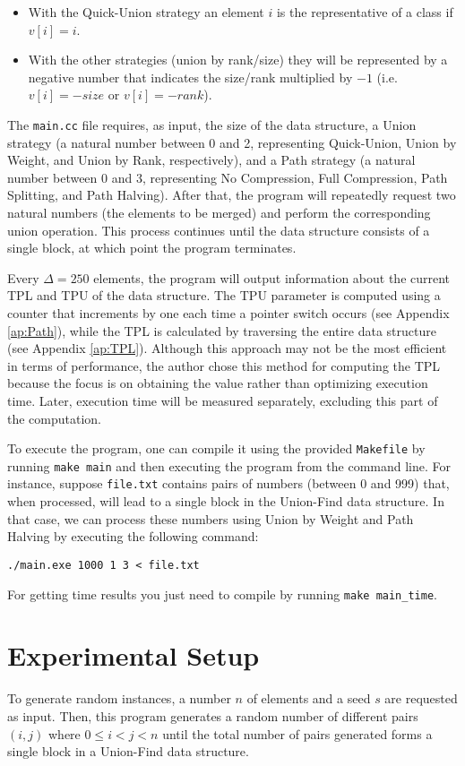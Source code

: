 \begin{itemize}
    \item With the Quick-Union strategy an element $i$ is the representative of a class if $v[i] = i$.
    \item With the other strategies (union by rank/size) they will be represented by a negative number that indicates the size/rank multiplied by $-1$ (i.e. $v[i] = -size$ or $v[i] = -rank$).
\end{itemize}

The \texttt{main.cc} file requires, as input, the size of the data structure, a Union strategy (a natural number between 0 and 2, representing Quick-Union, Union by Weight, and Union by Rank, respectively), and a Path strategy (a natural number between 0 and 3, representing No Compression, Full Compression, Path Splitting, and Path Halving). After that, the program will repeatedly request two natural numbers (the elements to be merged) and perform the corresponding union operation. This process continues until the data structure consists of a single block, at which point the program terminates.

Every $\Delta = 250$ elements, the program will output information about the current TPL and TPU of the data structure. The TPU parameter is computed using a counter that increments by one each time a pointer switch occurs (see Appendix \ref{ap:Path}), while the TPL is calculated by traversing the entire data structure (see Appendix \ref{ap:TPL}). Although this approach may not be the most efficient in terms of performance, the author chose this method for computing the TPL because the focus is on obtaining the value rather than optimizing execution time. Later, execution time will be measured separately, excluding this part of the computation.

To execute the program, one can compile it using the provided \texttt{Makefile} by running \texttt{make main} and then executing the program from the command line. For instance, suppose \texttt{file.txt} contains pairs of numbers (between 0 and 999) that, when processed, will lead to a single block in the Union-Find data structure. In that case, we can process these numbers using Union by Weight and Path Halving by executing the following command:

\texttt{./main.exe 1000 1 3 < file.txt}

For getting time results you just need to compile by running \texttt{make main\_time}.

\section{Experimental Setup}
To generate random instances, a number \( n \) of elements and a seed \( s \) are requested as input. Then, this program generates a random number of different pairs \( (i, j) \) where \( 0 \leq i < j < n \) until the total number of pairs generated forms a single block in a Union-Find data structure. 

